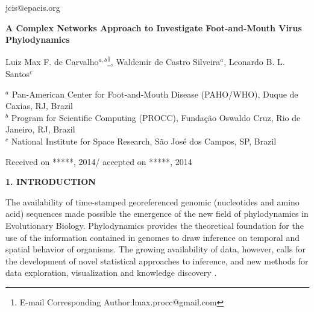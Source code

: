 \documentclass[12pt]{article}
\begin{document}
\linenumbers
{\footnotesize jcis@epacis.org}

\begin{center}

{\bf A Complex Networks Approach to Investigate Foot-and-Mouth Virus Phylodynamics}
\bigskip


{\small Luiz Max F. de Carvalho$^{a,b}$\footnote{E-mail Corresponding Author:lmax.procc@gmail.com},  Waldemir de Castro Silveira$^a$, Leonardo B. L. Santos$^{c}$
}
\smallskip

{\small
$^a$ Pan-American Center for Foot-and-Mouth Disease (PAHO/WHO), Duque de Caxias, RJ, Brazil\\
$^b$ Program for Scientific Computing (PROCC), Funda\c{c}\~ao Oswaldo Cruz, Rio de Janeiro, RJ, Brazil\\
$^c$ National Institute for Space Research, S\~ao Jos\'e dos Campos, SP, Brazil\\
}


{\footnotesize Received on *****, 2014/ accepted on *****, 2014}

\end{center}



\begin{abstract}
In this article we propose a network-based approach to the analysis and visualization of viral molecular data, which incorporates ecological and epidemiological information.
Foot-and-Mouth Disease virus (FMDV) is a highly mutant virus that affects cloven-hoofed livestock and a major animal health problem.
We use the methodology developed herein to analyze 167 VP1 (1D) serotype O FMDV gene sequences from South America.
Our data spans over eight countries, covering 16 years of FMDV circulation in the continent. 
\bigskip

{\footnotesize
{\bf Keywords}: Computational Biology and Bioinformatics, Complex Networks, Community Detection, Phylodynamics, Foot-and-Mouth Disease Virus}
\end{abstract}

\textbf{1. INTRODUCTION}

\bigskip
\bigskip

 

The availability of time-stamped georeferenced genomic (nucleotides and amino acid) sequences made possible the emergence of the  new field of phylodynamics \cite{grenfell, MEP} in Evolutionary Biology.
Phylodynamics provides the theoretical foundation for the use of the information contained in genomes to draw inference on temporal and spatial behavior of organisms.
The growing availability of  data, however, calls for the development of novel statistical approaches to inference, and new methods for data exploration, visualization and knowledge discovery \cite{putting, cancer, PRE, Gavin2004, Pirovani}.
\end{document}
